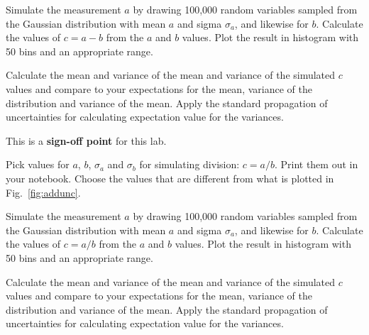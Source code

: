 \begin{plot} 
Simulate the measurement $a$ by drawing 100,000 random variables
sampled from the Gaussian distribution with mean $a$ and sigma
$\sigma_a$, and likewise for $b$.  Calculate the values of $c = a -b $ from
the $a$ and $b$ values.  Plot the result in histogram with 50 bins and an appropriate range. \end{plot} 

\begin{print} 
Calculate the mean and variance of the mean and variance of the simulated $c$ values and compare to your expectations for the mean, variance of the distribution and variance of the mean. Apply the standard propagation of uncertainties for calculating expectation value for the variances. 
 \end{print}


This is a \textbf{sign-off point} for this lab. 

\begin{print} Pick values for $a$, $b$, $ \sigma_a$ and $ \sigma_b$ for simulating division: $c=a/b$. Print them out in your notebook.  Choose the values that are different from what is plotted in Fig.~\ref{fig:addunc}.  \end{print}

\begin{plot} 
Simulate the measurement $a$ by drawing 100,000 random variables
sampled from the Gaussian distribution with mean $a$ and sigma
$\sigma_a$, and likewise for $b$.  Calculate the values of $c = a/b $ from
the $a$ and $b$ values.  Plot the result in histogram with 50 bins and an appropriate range. \end{plot} 

\begin{print} 
Calculate the mean and variance of the mean and variance of the simulated $c$ values and compare to your expectations for the mean, variance of the distribution and variance of the mean. Apply the standard propagation of uncertainties for calculating expectation value for the variances. 
 \end{print}

 






























